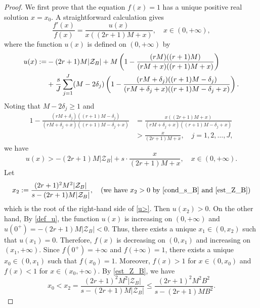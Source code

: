 \documentclass[12pt]{article}
\numberwithin{equation}{section}
\begin{document}
\begin{proof}
We first prove that the equation $f(x)=1$ has a unique positive real solution $x=x_0$. A straightforward calculation gives
\[ \frac{f'(x)}{f(x)} = \frac{u(x)}{x((2r+1)M+x)},  \quad x \in (0,+\infty), \]
where the function $u(x)$ is defined on $(0,+\infty)$ by
\begin{align}
u(x) :=&  -(2r+1)M|\mathcal{Z}_B| + M\left( 1 - \frac{(rM)((r+1)M)}{(rM+x)((r+1)M+x)} \right) \notag\\
&+  \frac{s}{J}\sum_{j=1}^{J} (M-2\delta_j)\left( 1 - \frac{(rM+\delta_j)((r+1)M-\delta_j)}{(rM+\delta_j+x)((r+1)M-\delta_j+x)} \right). \label{def_u}
\end{align}
Noting that $M-2\delta_j \geqslant 1$ and 
\begin{align*}
	1 - \frac{(rM+\delta_j)((r+1)M-\delta_j)}{(rM+\delta_j+x)((r+1)M-\delta_j+x)} &= \frac{x((2r+1)M+x)}{(rM+\delta_j+x)((r+1)M-\delta_j+x)} \\
	&> \frac{x}{(2r+1)M + x}, \quad j=1,2,\ldots,J,
\end{align*}
we have
\begin{equation}\label{u>}
	u(x) >  -(2r+1)M|\mathcal{Z}_B| + s \cdot \frac{x}{(2r+1)M + x}, \quad x \in (0,+\infty). 
\end{equation}
Let 
\[ x_2 := \frac{(2r+1)^2M^2|\mathcal{Z}_B|}{s - (2r+1)M|\mathcal{Z}_B|}, \quad (\text{we have~} x_2 > 0 \text{~by \eqref{cond_s_B} and \eqref{est_Z_B}}) \]
which is the root of the right-hand side of \eqref{u>}. Then $u(x_2)>0$. On the other hand, By \eqref{def_u}, the function $u(x)$ is increasing on $(0,+\infty)$ and $u(0^{+}) = -(2r+1)M|\mathcal{Z}_B| < 0$. Thus, 
there exists a unique $x_1 \in (0,x_2)$ such that $u(x_1) = 0$. Therefore, $f(x)$ is decreasing on $(0,x_1)$ and increasing on $(x_1,+\infty)$. Since $f(0^{+}) = +\infty$ and $f(+\infty) = 1$, there exists a unique $x_0 \in (0,x_1)$ such that $f(x_0) = 1$. Moreover, $f(x) > 1$ for $x \in (0,x_0)$ and $f(x)<1$ for $x \in (x_0,+\infty)$. By \eqref{est_Z_B}, we have 
\begin{equation}\label{x_0_<}
	x_0 < x_2 = \frac{(2r+1)^2M^2|\mathcal{Z}_B|}{s - (2r+1)M|\mathcal{Z}_B|} \leqslant \frac{(2r+1)^2M^2B^2}{s - (2r+1)MB^2}.
\end{equation}


\end{proof}
\end{document}
